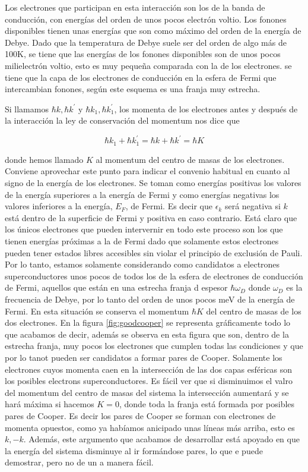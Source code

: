 Los electrones que participan en esta interacción son los de la banda de conducción, con energías del orden de unos pocos electrón voltio. Los fonones disponibles tienen unas energías que son como máximo del orden de \color{red}la energía de Debye\color{black}. Dado que la temperatura de Debye suele ser del orden de algo más de 100K, se tiene que las energías de los fonones disponibles son de unos pocos milielectrón voltio, esto es muy pequeña comparada con la de los electrones. se tiene que la capa de los electrones de conducción en la esfera de Fermi que intercambian fonones, según este esquema es una franja muy estrecha.

Si llamamos $\hbar k, \hbar k^\prime$ y $\hbar k_1, \hbar k_1^\prime$, los momenta de los electrones antes y después de la interacción la ley de conservación del momentum nos dice que

\begin{equation*}
    \hbar k_1 + \hbar k_1^\prime = \hbar k + \hbar k^\prime = \hbar K
\end{equation*}

donde hemos llamado $K$ al momentum del centro de masas de los electrones. Conviene aprovechar este punto para indicar el convenio habitual en cuanto al signo de la energía de los electrones. Se toman como energías positivas los valores de la energía superiores a la energía de Fermi y como energías negativas los valores inferiores a la energía, $E_F$, de Fermi. Es decir que $\epsilon_k$ será negativa si $k$ está dentro de la superficie de Fermi y positiva en caso contrario. Está claro que los únicos electrones que pueden intervernir en todo este proceso son los que tienen energías próximas a la de Fermi dado que solamente estos electrones pueden tener estados libres accesibles sin violar el principio de exclusión de Pauli. Por lo tanto, estamos solamente considerando como candidatos a electrones superconductores unos pocos de todos los de la esfera de electrones de conducción de Fermi, aquellos que están en una estrecha franja d espesor $\hbar \omega_D$ donde $\omega_D$ es la frecuencia de Debye, por lo tanto del orden de unos pocos meV de la energía de Fermi. En esta situación se conserva el momentum $\hbar K$ del centro de masas de los dos electrones. En la figura \ref{fig:goodcooper} se representa gráficamente todo lo que acabamos de decir, además se observa en esta figura que son, dentro de la estrecha franja, muy pocos los electrones que cumplen todas las condiciones y que por lo tanot pueden ser candidatos a formar pares de Cooper. Solamente los electrones cuyos momenta caen en la intersección de las dos capas esféricas son los posibles electrons superconductores. Es fácil ver que si disminuimos el valro del momentum del centro de masas del sistema la intersección aumentará y se hará máxima si hacemos $K = 0$, donde toda la franja está formada por posibles pares de Cooper. Es decir los pares de Cooper se forman con electrones de momenta opuestos, como ya habíamos anicipado unas líneas más arriba, esto es $k, -k$.  Además, este argumento que acabamos de desarrollar está apoyado en que la energía del sistema disminuye al ir formándose pares, lo que e puede demostrar, pero no de un a manera fácil.


